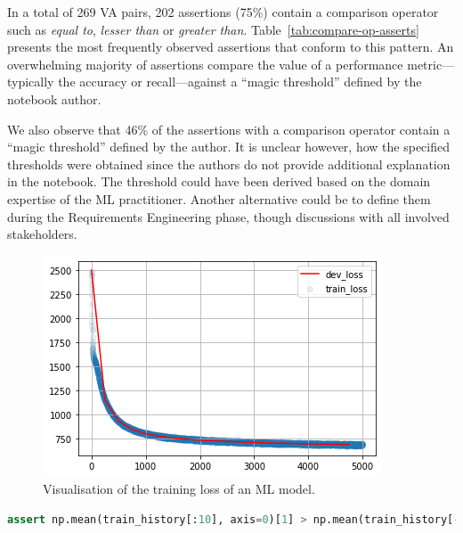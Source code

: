 \documentclass[conference]{IEEEtran}
\begin{document}
In a total of 269 VA pairs, 202 assertions (75\%) contain a comparison operator such as \emph{equal to}, \emph{lesser than} or \emph{greater than}. Table~\ref{tab:compare-op-asserts} presents the most frequently observed assertions that conform to this pattern. An overwhelming majority of assertions compare the value of a performance metric---typically the accuracy or recall---against a ``magic threshold'' defined by the notebook author.

We also observe that 46\% of the assertions with a comparison operator contain a ``magic threshold'' defined by the author. It is unclear however, how the specified thresholds were obtained since the authors do not provide additional explanation in the notebook. The threshold could have been derived based on the domain expertise of the ML practitioner. Another alternative could be to define them during the Requirements Engineering phase, though discussions with all involved stakeholders\cite{CITEME}.

\begin{figure}
  \includegraphics[width=\linewidth]{../catalogue/select-16.png}
  \caption{Visualisation of the training loss of an ML model.}\label{fig:loss}
\end{figure}

\begin{lstlisting}[language=Python, caption={Assertion to check that the mean of the first 10 observations of the loss is higher than the mean of the last 10 observations. In other words, the assertion checks if the loss function is converging to an optimal minima.}, label={lst:loss}]
assert np.mean(train_history[:10], axis=0)[1] > np.mean(train_history[-10:], axis=0)[1], "The model didn't converge."
\end{lstlisting}
\end{document}
